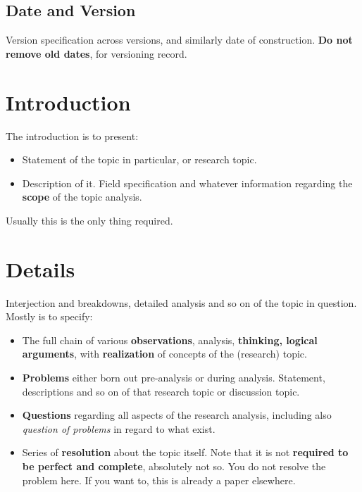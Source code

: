 \documentclass[10pt,a4paper]{article}
\begin{document}
\subsection{Date and Version}

Version specification across versions, and similarly date of construction. \textbf{Do not remove old dates}, for versioning record. 

\section{Introduction}
\label{sec:intro}

The introduction is to present:

\begin{itemize}[topsep=1pt,itemsep=1pt]
    \item Statement of the topic in particular, or research topic. 
    \item Description of it. Field specification and whatever information regarding the \textbf{scope} of the topic analysis. 
\end{itemize}

Usually this is the only thing required. 

\section{Details}

Interjection and breakdowns, detailed analysis and so on of the topic in question. Mostly is to specify: 

\begin{itemize}
    \item The full chain of various \textbf{observations}, analysis, \textbf{thinking, logical arguments}, with \textbf{realization} of concepts of the (research) topic. 
    \item \textbf{Problems} either born out pre-analysis or during analysis. Statement, descriptions and so on of that research topic or discussion topic. 
    \item \textbf{Questions} regarding all aspects of the research analysis, including also \textit{question of problems} in regard to what exist. 
    \item Series of \textbf{resolution} about the topic itself. Note that it is not \textbf{required to be perfect and complete}, absolutely not so. You do not resolve the problem here. If you want to, this is already a paper elsewhere.  
\end{itemize}
\end{document}
